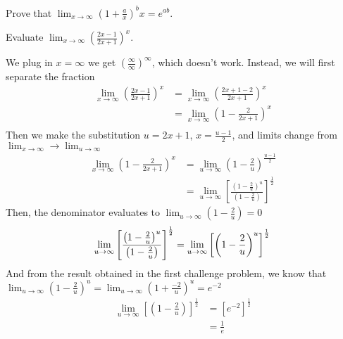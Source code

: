 \documentclass[working]{tuftebook}
\begin{document}
\newpage 
\begin{challenge}
    \item{Prove that $\displaystyle \lim_{x\to \infty } \left( 1+ \frac{a}{x} \right)^bx=e^{ab}$.}
    \item{Evaluate $\displaystyle \lim_{x\to \infty } \left(  \frac{2x-1}{2x+1} \right)^x$.}
\end{challenge}
\begin{solutions}
    \item{}
    \item{We plug in $x= \infty $ we get $( \frac{ \infty }{ \infty })^ \infty $, which doesn't work. Instead, we will first separate the fraction
            \begin{align*}
                \lim_{x\to \infty } \left( \frac{2x-1}{2x+1} \right)^x&= \lim_{x\to \infty } \left( \frac{2x+1-2}{2x+1} \right)^x\\ 
                                                                      &= \lim_{x\to \infty } \left( 1- \frac{2}{2x+1} \right)^x\\ 
            \end{align*}
        Then we make the substitution $u=2x+1$, $x= \frac{u-1}{2}$, and limits change from $\displaystyle \lim_{x\to \infty }\to \lim_{u\to \infty }$
        \begin{align*}
            \lim_{x\to \infty } \left( 1- \frac{2}{2x+1} \right)^x&= \lim_{u\to \infty } \left( 1- \frac{2}{u} \right)^ \frac{u-1}{2}\\ 
                                                                  &= \lim_{u\to \infty } \left[ \frac{ \left( 1- \frac{2}{u} \right)^u}{ \left( 1- \frac{2}{u} \right)} \right]^ \frac{1}{2}
        \end{align*}
        Then, the denominator evaluates to $\displaystyle \lim_{u\to \infty } \left( 1- \frac{2}{u} \right)=0$
        \[
            \lim_{u\to \infty } \left[ \frac{ \left( 1- \frac{2}{u} \right)^u}{ \left( 1- \frac{2}{u} \right)} \right]^ \frac{1}{2}= \lim_{u\to \infty } \left[ \left( 1- \frac{2}{u} \right)^u \right]^ \frac{1}{2}\\
        \]
        And from the result obtained in the first challenge problem, we know that $\displaystyle \lim_{u\to \infty } \left( 1- \frac{2}{u} \right)^u= \lim_{u\to \infty } \left( 1+ \frac{-2}{u} \right)^u=e^{-2}$ 
        \begin{align*}
            \lim_{u\to \infty } \left[ \left( 1- \frac{2}{u} \right) \right]^ \frac{1}{2}&= \left[ e^{-2} \right]^ \frac{1}{2}\\
                                                                                         &= \frac{1}{e} 
        \end{align*}
        }
\end{solutions}
\end{document}
